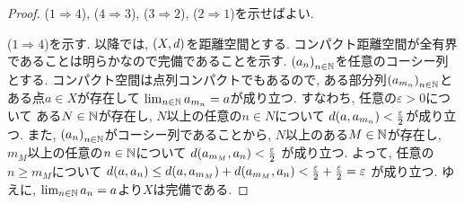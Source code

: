 \documentclass[uplatex, dvipdfmx, a4paper, 12pt, class=jsbook, crop=false]{standalone}
\begin{document}
\begin{proof}
	(\(1 \Longrightarrow 4\)), (\(4 \Longrightarrow 3\)),
	(\(3 \Longrightarrow 2\)), (\(2 \Longrightarrow 1\))を示せばよい.

	(\(1 \Longrightarrow 4\))を示す.
	以降では, \( \lrparen{X, d} \)を距離空間とする.
	コンパクト距離空間が全有界であることは明らかなので完備であることを示す.
	\( \lrparen{a_n}_{n \in \N} \)を任意のコーシー列とする.
	コンパクト空間は点列コンパクトでもあるので,
	ある部分列\( \lrparen{a_{m_n}}_{n \in \N} \)とある点\( a \in X \)が存在して
	\( \lim_{n \in \mathbb{N}} a_{m_n} = a \)が成り立つ.
	すなわち, 任意の\( \varepsilon > 0 \)について
	ある\( N \in \mathbb{N} \)が存在し,
	\( N \)以上の任意の\( n \in N \)について
	\( d\lrparen{a, a_{m_n}} < \frac{\varepsilon}{2} \)が成り立つ.
	また, \( \lrparen{a_n}_{n \in \N} \)がコーシー列であることから,
	\( N \)以上のある\( M \in \mathbb{N} \)が存在し,
	\( m_M \)以上の任意の\( n \in \mathbb{N} \)について
	\( d\lrparen{a_{m_M}, a_n} < \frac{\varepsilon}{2} \)
	が成り立つ.
	よって, 任意の\( n \geq m_M \)について
	\( d\lrparen{a, a_n} \leq
	d\lrparen{a, a_{m_M}} + d\lrparen{a_{m_M}, a_n}
	< \frac{\varepsilon}{2} + \frac{\varepsilon}{2} = \varepsilon \)
	が成り立つ.
	ゆえに, \( \lim_{n \in \mathbb{N}} a_{n} = a \)より\( X \)は完備である.


\end{proof}
\end{document}
